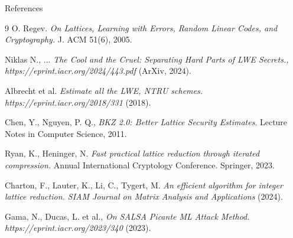 \documentclass{beamer}
\begin{document}
\begin{frame}{References}
  \footnotesize
  \begin{thebibliography}{9}
    O. Regev. \emph{On Lattices, Learning with Errors, Random Linear Codes, and Cryptography.} J. ACM 51(6), 2005.

    Niklas N., ...
    \emph{The Cool and the Cruel: Separating Hard Parts of LWE Secrets., https://eprint.iacr.org/2024/443.pdf}
    (ArXiv, 2024).
    
    Albrecht et al. \emph{Estimate all the LWE, NTRU schemes.  https://eprint.iacr.org/2018/331} (2018).

    Chen, Y., Nguyen, P. Q.,
    \emph{BKZ 2.0: Better Lattice Security Estimates}.
    Lecture Notes in Computer Science, 2011.

    Ryan, K., Heninger, N.
    \emph{Fast practical lattice reduction through iterated compression.}
    Annual International Cryptology Conference. Springer, 2023.

    Charton, F., Lauter, K., Li, C., Tygert, M.
    \emph{An efficient algorithm for integer lattice reduction. SIAM Journal on Matrix Analysis and Applications}
    (2024).

    Gama, N., Ducas, L. et al.,
    \emph{On SALSA Picante ML Attack Method. https://eprint.iacr.org/2023/340} (2023).
  \end{thebibliography}
\end{frame}

\end{document}
